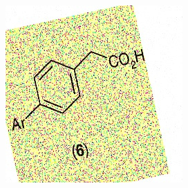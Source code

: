 \begin{figure}[H]
\begin{subfigure}{.28\textwidth}
        \includegraphics[width=1\linewidth]{imagenes/aug3/183.jpg}
    \end{subfigure}%

    \bigskip


\end{figure}
